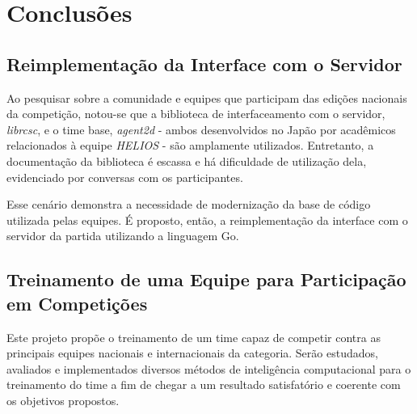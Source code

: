 
\chapter{Conclusões}

\label{CapConclusoes}


\section{Reimplementação da Interface com o Servidor}
\par Ao pesquisar sobre a comunidade e equipes que participam das edições nacionais da competição, notou-se que a biblioteca de interfaceamento com o servidor, \textit{librcsc}, e o time base, \textit{agent2d} - ambos desenvolvidos no Japão por acadêmicos relacionados à equipe \textit{HELIOS} - são amplamente utilizados. Entretanto, a documentação da biblioteca é escassa e há dificuldade de utilização dela, evidenciado por conversas com os participantes.
\par Esse cenário demonstra a necessidade de modernização da base de código utilizada pelas equipes.
É proposto, então, a reimplementação da interface com o servidor da partida utilizando a linguagem Go.

\section{Treinamento de uma Equipe para Participação em Competições}
 \par Este projeto propõe o treinamento de um time capaz de competir contra as principais equipes nacionais e internacionais da categoria. 
 Serão estudados, avaliados e implementados diversos métodos de inteligência computacional para o treinamento do time a fim de chegar a um resultado satisfatório e coerente com os objetivos propostos. 
 
